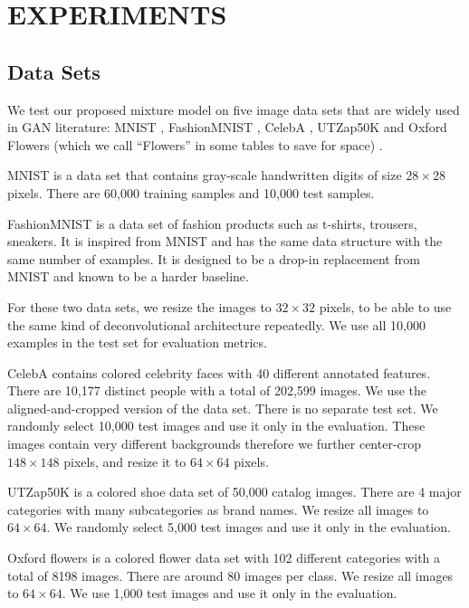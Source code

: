 \documentclass[a4paper,onesided,12pt]{report}
\begin{document}
\chapter{EXPERIMENTS}
\label{chapter:exps}

\section{Data Sets}
\label{sec:datasets}
We test our proposed mixture model on five image data sets that are widely used in GAN literature: MNIST \cite{lecun1998mnist}, FashionMNIST \cite{xiao2017fashion}, CelebA \cite{liu2015deep},  UTZap50K \cite{yu2014fine} and Oxford Flowers (which we call ``Flowers'' in some tables to save for space) \cite{nilsback2008automated}.

MNIST is a data set that contains gray-scale handwritten digits of size $28 \times 28$ pixels. There are 60,000 training samples and 10,000 test samples.

FashionMNIST is a data set of fashion products such as t-shirts, trousers, sneakers. It is inspired from MNIST and has the same data structure with the same number of examples. It is designed to be a drop-in replacement from MNIST and known to be a harder baseline.

For these two data sets, we resize the images to $32 \times 32$ pixels, to be able to use the same kind of deconvolutional architecture repeatedly. We use all 10,000 examples in the test set for evaluation metrics.

CelebA contains colored celebrity faces with 40 different annotated features. There are 10,177 distinct people with a total of 202,599 images. We use the aligned-and-cropped version of the data set. There is no separate test set. We randomly select 10,000 test images and use it only in the evaluation. These images contain very different backgrounds therefore we further center-crop $148 \times 148$ pixels, and resize it to $64 \times 64$ pixels.

UTZap50K is a colored shoe data set of 50,000 catalog images. There are 4 major categories with many subcategories as brand names. We resize all images to $64 \times 64$. We randomly select 5,000 test images and use it only in the evaluation.

Oxford flowers is a colored flower data set with 102 different categories with a total of 8198 images. There are around 80 images per class. We resize all images to $64 \times 64$. We use 1,000 test images and use it only in the evaluation.
\end{document}
